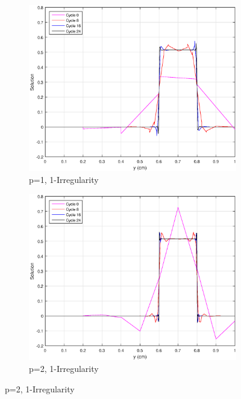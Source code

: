\begin{figure}
\centering
{
	\begin{subfigure}[b]{0.45\textwidth}
		\centering
		\label{subfig::SL_uniform_ef_pwl1_irr1}
		\includegraphics[width=\textwidth]{figures/sec_BF/SL_AMR_PWLD_k1_Irr1.eps}
		\caption{p=1, 1-Irregularity}
	\end{subfigure}
	\hfill
	\begin{subfigure}[b]{0.45\textwidth}
		\centering
		\label{subfig::SL_uniform_ef_pwl2_irr1}
		\includegraphics[width=\textwidth]{figures/sec_BF/SL_AMR_PWLD_k2_Irr1.eps}
		\caption{p=2, 1-Irregularity}
	\end{subfigure}
}
\end{figure}
